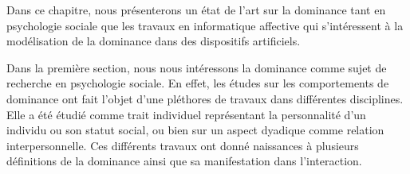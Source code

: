 %
%
%
%
%	
%
%
%
%

Dans ce chapitre, nous présenterons un état de l'art sur la dominance tant en psychologie sociale que les travaux en informatique affective qui s'intéressent à la modélisation de la dominance dans des dispositifs artificiels. 

Dans la première section, nous nous intéressons la dominance comme sujet de recherche en psychologie sociale. En effet, les études sur les comportements de dominance ont fait l'objet d'une pléthores de travaux dans différentes disciplines. Elle a été étudié comme trait individuel représentant la personnalité d'un individu ou son statut social, ou bien sur un aspect dyadique comme relation interpersonnelle. Ces différents travaux ont donné naissances à plusieurs définitions de la dominance ainsi que sa manifestation dans l'interaction.

